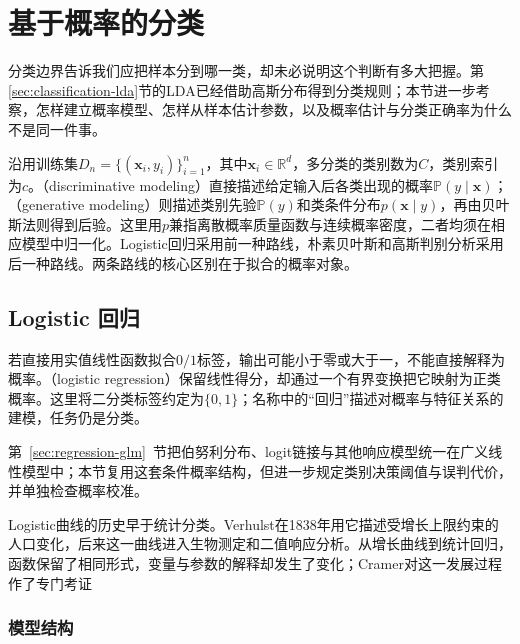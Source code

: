 \section{基于概率的分类}
\label{sec:classification-probability}

分类边界告诉我们应把样本分到哪一类，却未必说明这个判断有多大把握。第\ref{sec:classification-lda}节的LDA已经借助高斯分布得到分类规则；本节进一步考察，怎样建立概率模型、怎样从样本估计参数，以及概率估计与分类正确率为什么不是同一件事。

沿用训练集$D_n=\{(\bm{x}_i,y_i)\}_{i=1}^{n}$，其中$\bm{x}_i\in\mathbb{R}^{d}$，多分类的类别数为$C$，类别索引为$c$。（discriminative modeling）直接描述给定输入后各类出现的概率$\mathbb{P}(y\mid\bm{x})$；（generative modeling）则描述类别先验$\mathbb{P}(y)$和类条件分布$p(\bm{x}\mid y)$，再由贝叶斯法则得到后验。这里用$p$兼指离散概率质量函数与连续概率密度，二者均须在相应模型中归一化。Logistic回归采用前一种路线，朴素贝叶斯和高斯判别分析采用后一种路线。两条路线的核心区别在于拟合的概率对象。

\subsection{Logistic 回归}
\label{sec:classification-logistic}

若直接用实值线性函数拟合$0/1$标签，输出可能小于零或大于一，不能直接解释为概率。（logistic regression）保留线性得分，却通过一个有界变换把它映射为正类概率。这里将二分类标签约定为$\{0,1\}$；名称中的“回归”描述对概率与特征关系的建模，任务仍是分类。

第~\ref{sec:regression-glm}~节把伯努利分布、logit链接与其他响应模型统一在广义线性模型中；本节复用这套条件概率结构，但进一步规定类别决策阈值与误判代价，并单独检查概率校准。

Logistic曲线的历史早于统计分类。Verhulst在1838年用它描述受增长上限约束的人口变化，后来这一曲线进入生物测定和二值响应分析。从增长曲线到统计回归，函数保留了相同形式，变量与参数的解释却发生了变化；Cramer对这一发展过程作了专门考证

\subsubsection{模型结构}
\label{sec:classification-logistic-structure}


